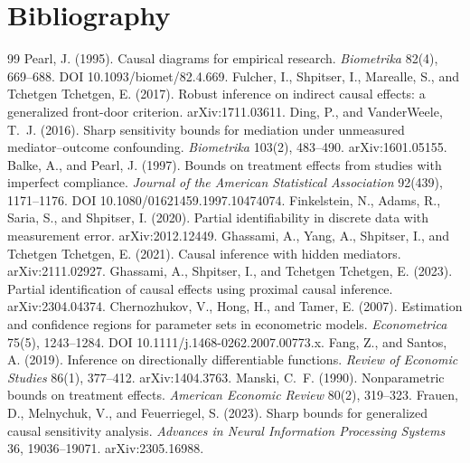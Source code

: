 \documentclass[11pt]{article}
\theoremstyle{definition}
\theoremstyle{plain}
\theoremstyle{remark}
\begin{document}
\section*{Bibliography}
\begin{thebibliography}{99}
 Pearl, J. (1995). Causal diagrams for empirical research.
  \textit{Biometrika} 82(4), 669--688. DOI 10.1093/biomet/82.4.669.
 Fulcher, I., Shpitser, I., Marealle, S.,
  and Tchetgen Tchetgen, E. (2017). Robust inference on indirect causal effects: a generalized front-door
  criterion. arXiv:1711.03611.
 Ding, P., and VanderWeele, T.~J. (2016). Sharp
  sensitivity bounds for mediation under unmeasured mediator--outcome confounding. \textit{Biometrika}
  103(2), 483--490. arXiv:1601.05155.
 Balke, A., and Pearl, J. (1997). Bounds on treatment effects from studies
  with imperfect compliance. \textit{Journal of the American Statistical Association} 92(439), 1171--1176.
  DOI 10.1080/01621459.1997.10474074.
 Finkelstein, N., Adams, R., Saria, S., and
  Shpitser, I. (2020). Partial identifiability in discrete data with measurement error. arXiv:2012.12449.
 Ghassami, A., Yang, A., Shpitser, I., and
  Tchetgen Tchetgen, E. (2021). Causal inference with hidden mediators. arXiv:2111.02927.
 Ghassami, A., Shpitser, I., and Tchetgen Tchetgen, E.
  (2023). Partial identification of causal effects using proximal causal inference. arXiv:2304.04374.
 Chernozhukov, V., Hong, H., and Tamer, E. (2007).
  Estimation and confidence regions for parameter sets in econometric models. \textit{Econometrica} 75(5),
  1243--1284. DOI 10.1111/j.1468-0262.2007.00773.x.
 Fang, Z., and Santos, A. (2019). Inference on
  directionally differentiable functions. \textit{Review of Economic Studies} 86(1), 377--412.
  arXiv:1404.3763.
 Manski, C.~F. (1990). Nonparametric bounds on treatment effects.
  \textit{American Economic Review} 80(2), 319--323.
 Frauen, D., Melnychuk, V., and Feuerriegel, S. (2023).
  Sharp bounds for generalized causal sensitivity analysis. \textit{Advances in Neural Information
  Processing Systems} 36, 19036--19071. arXiv:2305.16988.
\end{thebibliography}
\end{document}
